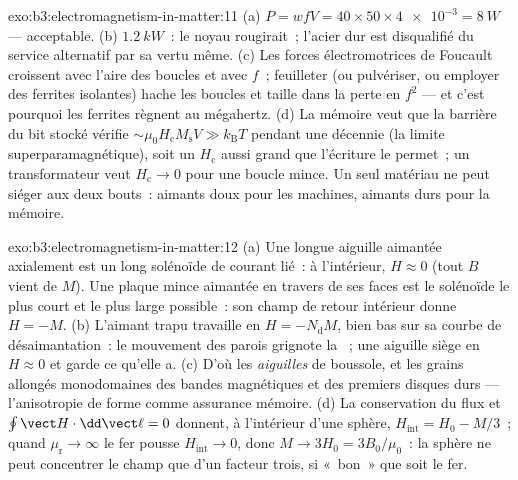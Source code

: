 \begin{solution}{exo:b3:electromagnetism-in-matter:11}
(a) $P = wfV = 40\times50\times\num{4e-3} = \qty{8}{W}$ ---
acceptable. (b) $\qty{1.2}{kW}$~: le noyau rougirait~; l'acier dur
est disqualifié du service alternatif par sa vertu même. (c) Les
forces électromotrices de Foucault croissent avec l'aire des boucles
et avec $f$~; feuilleter (ou pulvériser, ou employer des ferrites
isolantes) hache les boucles et taille dans la perte en $f^2$ ---
et c'est pourquoi les ferrites règnent au mégahertz. (d) La mémoire
veut que la barrière du bit stocké vérifie
$\sim\mu_0H_{\text{c}}M_{\text{s}}V \gg
k_{\text{B}}T$ pendant une décennie (la limite
superparamagnétique), soit un $H_{\text{c}}$ aussi grand que
l'écriture le permet~; un transformateur veut
$H_{\text{c}} \to 0$ pour une boucle mince. Un seul matériau ne peut
siéger aux deux bouts~: aimants doux pour les machines, aimants durs
pour la mémoire.
\end{solution}

\begin{solution}{exo:b3:electromagnetism-in-matter:12}
(a) Une longue aiguille aimantée axialement est un long solénoïde de
courant lié~: à l'intérieur, $H \approx 0$ (tout $B$ vient de $M$).
Une plaque mince aimantée en travers de ses faces est le solénoïde
le plus court et le plus large possible~: son champ de retour
intérieur donne $H = -M$. (b)
L'aimant trapu travaille en $H = -N_{\text{d}}M$, bien bas sur sa
courbe de désaimantation~: le mouvement des parois grignote la
~; une aiguille siège en $H \approx 0$ et garde ce qu'elle
a. (c) D'où les \emph{aiguilles} de boussole, et les grains
allongés monodomaines des bandes magnétiques et des premiers disques
durs --- l'anisotropie de forme comme assurance mémoire. (d) La
conservation du flux et $\oint\vect H\cdot
\dd\vect\ell = 0$ donnent, à l'intérieur d'une sphère, $H_{\text{int}} =
H_0 - M/3$~; quand $\mu_{\text{r}}\to\infty$ le fer pousse
$H_{\text{int}}\to0$, donc $M \to 3H_0 = 3B_0/\mu_0$~: la sphère ne
peut concentrer le champ que d'un facteur trois, si «~bon~» que soit
le fer.
\end{solution}

